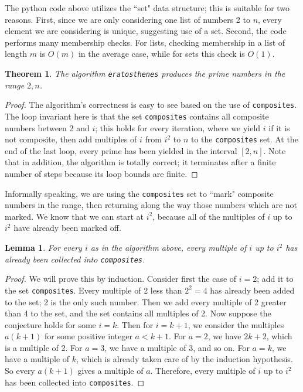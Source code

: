 \documentclass{amsart}
\newtheorem{thm}{Theorem}
\newtheorem{lem}{Lemma}
\theoremstyle{definition}
\theoremstyle{case}
\begin{document}
	The python code above utilizes the ``set" data structure; this is suitable for two reasons. First, since we are only considering one list of numbers 2 to $n$, every element we are considering is unique, suggesting use of a set. Second, the code performs many membership checks. For lists, checking membership in a list of length $m$ is $O(m)$ in the average case, while for sets this check is $O(1)$.
	
	\begin{thm}
		The algorithm \texttt{eratosthenes} produces the prime numbers in the range $2, n$.
	\end{thm}
	\begin{proof}
		The algorithm's correctness is easy to see based on the use of \texttt{composites}. The loop invariant here is that the set \texttt{composites} contains all composite numbers between 2 and $i$; this holds for every iteration, where we yield $i$ if it is not composite, then add multiples of $i$ from $i^2$ to $n$ to the \texttt{composites} set. At the end of the last loop, every prime has been yielded in the interval $[2, n]$. Note that in addition, the algorithm is totally correct; it terminates after a finite number of steps because its loop bounds are finite.
	\end{proof}

	Informally speaking, we are using the \texttt{composites} set to ``mark" composite numbers in the range, then returning along the way those numbers which are not marked. We know that we can start at $i^2$, because all of the multiples of $i$ up to $i^2$ have already been marked off.
	
	\begin{lem}
		For every $i$ as in the algorithm above, every multiple of $i$ up to $i^2$ has already been collected into \texttt{composites}.
	\end{lem}
	\begin{proof}
		We will prove this by induction. Consider first the case of $i=2$; add it to the set \texttt{composites}. Every multiple of 2 less than $2^2 = 4$ has already been added to the set; 2 is the only such number. Then we add every multiple of 2 greater than 4 to the set, and the set contains all multiples of 2.
		Now suppose the conjecture holds for some $i=k$. Then for $i=k+1$, we consider the multiples $a(k+1)$ for some positive integer $a<k+1$. For $a=2$, we have $2k+2$, which is a multiple of 2. For $a=3$, we have a multiple of 3, and so on. For $a=k$, we have a multiple of $k$, which is already taken care of by the induction hypothesis. So every $a(k+1)$ gives a multiple of $a$. Therefore, every multiple of $i$ up to $i^2$ has been collected into \texttt{composites}.
	\end{proof}
	
\end{document}
